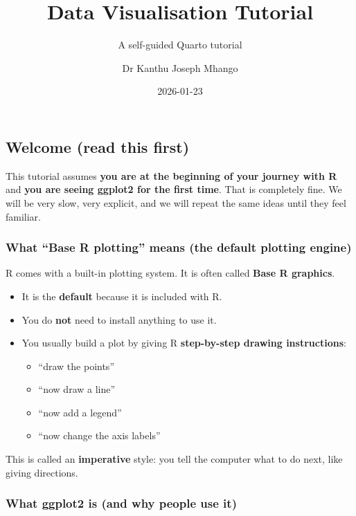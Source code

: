 \documentclass[
  letterpaper,
  DIV=11,
  numbers=noendperiod]{scrartcl}
\title{Data Visualisation Tutorial}
\subtitle{A self-guided Quarto tutorial}
\author{Dr Kanthu Joseph Mhango}
\date{2026-01-23}
\providecommand{\tightlist}{%
  \setlength{\itemsep}{0pt}\setlength{\parskip}{0pt}}\usepackage{longtable,booktabs,array}
\begin{document}
\maketitle


\subsection{Welcome (read this first)}\label{welcome-read-this-first}

This tutorial assumes \textbf{you are at the beginning of your journey
with R} and \textbf{you are seeing ggplot2 for the first time}. That is
completely fine. We will be very slow, very explicit, and we will repeat
the same ideas until they feel familiar.

\subsubsection{What ``Base R plotting'' means (the default plotting
engine)}\label{what-base-r-plotting-means-the-default-plotting-engine}

R comes with a built-in plotting system. It is often called \textbf{Base
R graphics}.

\begin{itemize}
\tightlist
\item
  It is the \textbf{default} because it is included with R.
\item
  You do \textbf{not} need to install anything to use it.
\item
  You usually build a plot by giving R \textbf{step-by-step drawing
  instructions}:

  \begin{itemize}
  \tightlist
  \item
    ``draw the points''
  \item
    ``now draw a line''
  \item
    ``now add a legend''
  \item
    ``now change the axis labels''
  \end{itemize}
\end{itemize}

This is called an \textbf{imperative} style: you tell the computer what
to do next, like giving directions.

\subsubsection{What ggplot2 is (and why people use
it)}\label{what-ggplot2-is-and-why-people-use-it}
\end{document}
